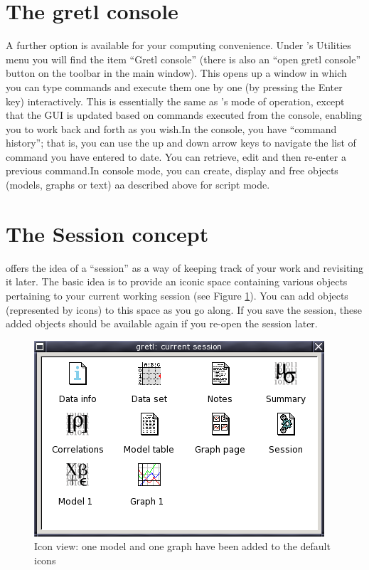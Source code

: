 \section{The gretl console}
\label{console}

A further option is available for your computing convenience. Under
's Utilities menu you will find the item ``Gretl console''
(there is also an ``open gretl console'' button on the toolbar in the
main window).  This opens up a window in which you can type commands
and execute them one by one (by pressing the Enter key) interactively.
This is essentially the same as 's mode of operation,
except that the GUI is updated based on commands executed from the
console, enabling you to work back and forth as you wish.In the
console, you have ``command history''; that is, you can use the up and
down arrow keys to navigate the list of command you have entered to
date.  You can retrieve, edit and then re-enter a previous command.In
console mode, you can create, display and free objects (models, graphs
or text) aa described above for script mode.

\section{The Session concept}
\label{session}

 offers the idea of a ``session'' as a way of keeping track
of your work and revisiting it later. The basic idea is to provide an
iconic space containing various objects pertaining to your current
working session (see Figure \ref{fig-session}).  You can add objects
(represented by icons) to this space as you go along.  If you save the
session, these added objects should be available again if you re-open
the session later.

\begin{figure}[htbp]
  \caption{Icon view: one model and one graph have been added to the
    default icons}
  \label{fig-session}
  \begin{center}
    \includegraphics[scale=0.5]{figures/session}
  \end{center}
\end{figure}


